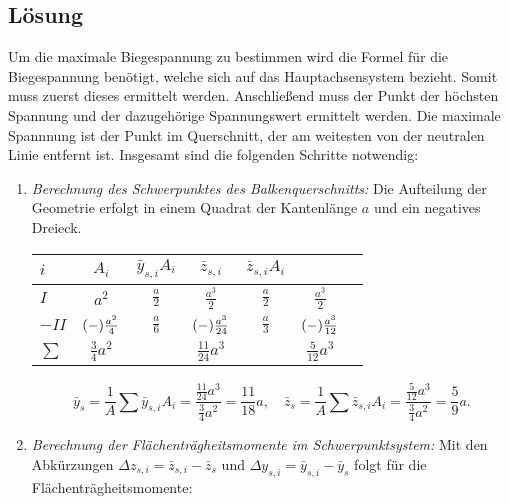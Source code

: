 \documentclass{exercise}
\begin{document}
    \subsection*{Lösung}
    Um die maximale Biegespannung zu bestimmen wird die Formel für die Biegespannung benötigt, welche sich auf das Hauptachsensystem bezieht.
    Somit muss zuerst dieses ermittelt werden.
    Anschließend muss der Punkt der höchsten Spannung und der dazugehörige Spannungswert ermittelt werden.
    Die maximale Spannnung ist der Punkt im Querschnitt, der am weitesten von der neutralen Linie entfernt ist.
    Insgesamt sind die folgenden Schritte notwendig:
    \begin{enumerate}[label=\arabic*)]
        \item \emph{Berechnung des Schwerpunktes des Balkenquerschnitts:} Die Aufteilung der Geometrie erfolgt in einem Quadrat der Kantenlänge \(a\) und ein negatives Dreieck.
        \begin{center}
            \begin{tabular}{lcccccc}
                \toprule
                \(i\) & \(A_i\) & \(\bar{y}_{s, i}A_i\) & \(\bar{z}_{s, i}\) & \(\bar{z}_{s, i}A_i\)\\
                \midrule
                \(I\) & \(a^2\) & \(\frac{a}{2}\) & \(\frac{a^3}{2}\) & \(\frac{a}{2}\) & \(\frac{a^3}{2}\)\\
                \(-II\) & \(\parentheses*{-}\frac{a^2}{4}\) & \(\frac{a}{6}\) & \(\parentheses*{-}\frac{a^3}{24}\) & \(\frac{a}{3}\) & \(\parentheses*{-}\frac{a^3}{12}\)\\
                \midrule
                \(\sum\) & \(\frac{3}{4}a^2\) & & \(\frac{11}{24}a^3\) & & \(\frac{5}{12}a^3\)\\
                \bottomrule
            \end{tabular}
        \end{center}
        \[
            \bar{y}_s = \frac{1}{A}\sum\bar{y}_{s, i}A_i = \frac{\frac{11}{24}a^3}{\frac{3}{4}a^2} = \frac{11}{18}a, \quad \bar{z}_s = \frac{1}{A}\sum\bar{z}_{s, i}A_i = \frac{\frac{5}{12}a^3}{\frac{3}{4}a^2} = \frac{5}{9}a.
        \]
        \item \emph{Berechnung der Flächenträgheitsmomente im Schwerpunktsystem:} Mit den Abkürzungen \(\Delta z_{s, i} = \bar{z}_{s, i} - \bar{z}_s\) und \(\Delta y_{s, i} = \bar{y}_{s, i} - \bar{y}_s\) folgt für die Flächenträgheitsmomente:
        \begin{center}
            \begin{tabular}{lcccccccc}

\end{tabular}
\end{center}
\end{enumerate}
\end{document}
